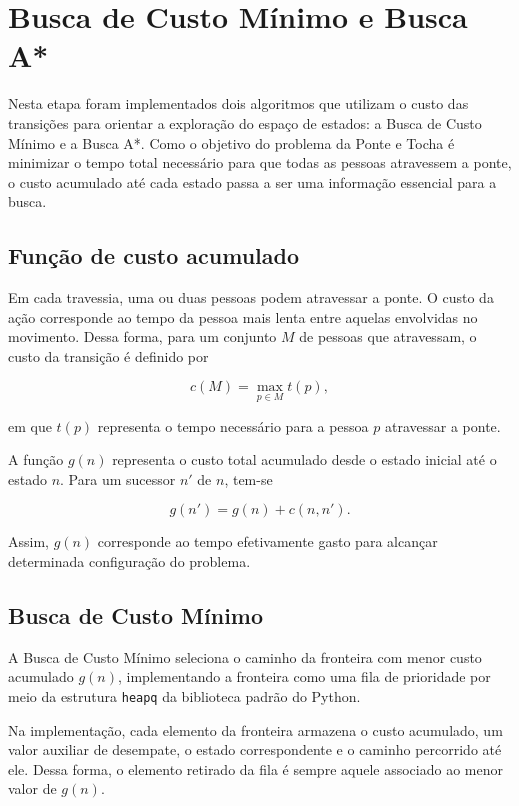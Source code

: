 \section{Busca de Custo Mínimo e Busca A*}
\label{sec:busca-informada}

Nesta etapa foram implementados dois algoritmos que utilizam o custo das
transições para orientar a exploração do espaço de estados: a Busca de Custo
Mínimo e a Busca A*. Como o objetivo do problema da Ponte e Tocha é minimizar
o tempo total necessário para que todas as pessoas atravessem a ponte, o custo
acumulado até cada estado passa a ser uma informação essencial para a busca.

\subsection{Função de custo acumulado}

Em cada travessia, uma ou duas pessoas podem atravessar a ponte. O custo da
ação corresponde ao tempo da pessoa mais lenta entre aquelas envolvidas no
movimento. Dessa forma, para um conjunto $M$ de pessoas que atravessam, o
custo da transição é definido por

\begin{equation}
	c(M)=\max_{p\in M} t(p),
\end{equation}

em que $t(p)$ representa o tempo necessário para a pessoa $p$ atravessar a
ponte.

A função $g(n)$ representa o custo total acumulado desde o estado inicial até
o estado $n$. Para um sucessor $n'$ de $n$, tem-se

\begin{equation}
	g(n') = g(n) + c(n,n').
\end{equation}

Assim, $g(n)$ corresponde ao tempo efetivamente gasto para alcançar determinada
configuração do problema.

\subsection{Busca de Custo Mínimo}

A Busca de Custo Mínimo seleciona o caminho da fronteira com menor custo
acumulado $g(n)$, implementando a fronteira como uma fila de prioridade por
meio da estrutura \texttt{heapq} da biblioteca padrão do Python.

Na implementação, cada elemento da fronteira armazena o custo acumulado, um
valor auxiliar de desempate, o estado correspondente e o caminho percorrido
até ele. Dessa forma, o elemento retirado da fila é sempre aquele associado ao
menor valor de $g(n)$.

